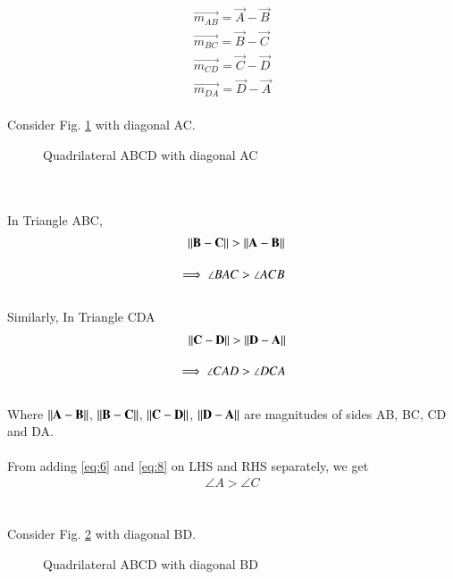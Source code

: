\documentclass[journal,12pt,twocolumn]{IEEEtran}
\begin{document}
\begin{align}
   \vec{m_{AB}} = \vec{A} - \vec{B}\\ 
   \vec{m_{BC}} = \vec{B} - \vec{C}\\
   \vec{m_{CD}} = \vec{C} - \vec{D}\\
   \vec{m_{DA}} = \vec{D} - \vec{A}
\end{align}\\
Consider Fig. \ref{Fig:2} with diagonal AC.
\begin{figure}[!ht]
    \centering
     \caption{Quadrilateral ABCD with diagonal AC}
     \label{Fig:2}
\end{figure}\\\\
In Triangle ABC,
\begin{align}
\lVert\mathbf{B-C}\rVert > \lVert\mathbf{A-B}\rVert\\[1em]
\implies \angle BAC > \angle ACB \label{eq:6}
\end{align}\\
Similarly, In Triangle CDA
\begin{align}
\lVert\mathbf{C-D}\rVert > \lVert\mathbf{D-A}\rVert\\[1em]
\implies \angle CAD > \angle DCA \label{eq:8}
\end{align}\\
Where $\lVert\mathbf{A-B}\rVert$, $\lVert\mathbf{B-C}\rVert$, $\lVert\mathbf{C-D}\rVert$, $\lVert\mathbf{D-A}\rVert$  are magnitudes of sides AB, BC, CD and DA.\\\\
From adding \eqref{eq:6} and \eqref{eq:8} on LHS and RHS separately, we get
\begin{align}
    \angle A > \angle C \label{eq:9}
\end{align}
\\\\
Consider Fig. \ref{Fig:3} with diagonal BD.
\begin{figure}[!ht]
    \centering
     \caption{Quadrilateral ABCD with diagonal BD}
     \label{Fig:3}
\end{figure}\\\\
\end{document}

